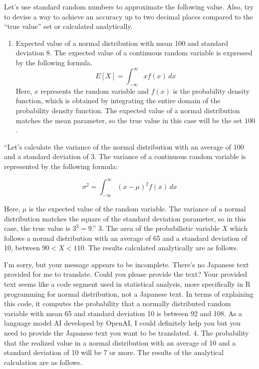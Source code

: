 \documentclass[
  a4paper,
]{book}
\providecommand{\tightlist}{%
  \setlength{\itemsep}{0pt}\setlength{\parskip}{0pt}}\usepackage{longtable,booktabs,array}
\begin{document}
Let's use standard random numbers to approximate the following value.
Also, try to devise a way to achieve an accuracy up to two decimal
places compared to the ``true value'' set or calculated analytically.

\begin{enumerate}
\def\labelenumi{\arabic{enumi}.}
\tightlist
\item
  Expected value of a normal distribution with mean 100 and standard
  deviation 8. The expected value of a continuous random variable is
  expressed by the following formula.
  \[E[X] = \int_{-\infty}^{\infty} x f(x) \, dx\] Here, \(x\) represents
  the random variable and \(f(x)\) is the probability density function,
  which is obtained by integrating the entire domain of the probability
  density function. The expected value of a normal distribution matches
  the mean parameter, so the true value in this case will be the set
  \(100\).
\end{enumerate}

``Let's calculate the variance of the normal distribution with an
average of 100 and a standard deviation of 3. The variance of a
continuous random variable is represented by the following formula:

\[\sigma^2 = \int_{-\infty}^{\infty} (x - \mu)^2 f(x) \, dx\]

Here, \(\mu\) is the expected value of the random variable. The variance
of a normal distribution matches the square of the standard deviation
parameter, so in this case, the true value is \(3^2 = 9\).'' 3. The area
of the probabilistic variable \(X\) which follows a normal distribution
with an average of 65 and a standard deviation of 10, between
\(90 < X < 110\). The results calculated analytically are as follows.

I'm sorry, but your message appears to be incomplete. There's no
Japanese text provided for me to translate. Could you please provide the
text? Your provided text seems like a code segment used in statistical
analysis, more specifically in R programming for normal distribution,
not a Japanese text. In terms of explaining this code, it computes the
probability that a normally distributed random variable with mean 65 and
standard deviation 10 is between 92 and 108. As a language model AI
developed by OpenAI, I could definitely help you but you need to provide
the Japanese text you want to be translated. 4. The probability that the
realized value in a normal distribution with an average of 10 and a
standard deviation of 10 will be 7 or more. The results of the
analytical calculation are as follows.
\end{document}
